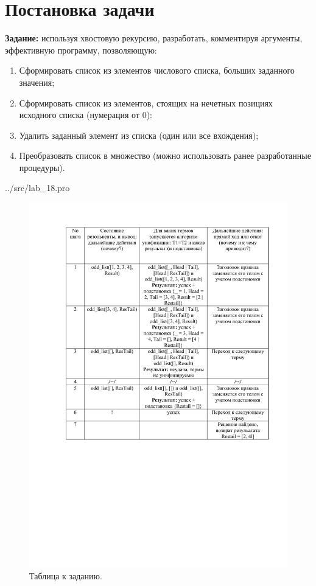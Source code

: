 \section*{Постановка задачи}

\textbf{Задание:} используя хвостовую рекурсию, разработать, комментируя аргументы, эффективную программу, позволяющую:
\begin{enumerate}
	\item Сформировать список из элементов числового списка, больших заданного значения;
	\item Сформировать список из элементов, стоящих на нечетных позициях исходного списка (нумерация от 0):
	\item Удалить заданный элемент из списка (один или все вхождения);
	\item Преобразовать список в множество (можно использовать ранее разработанные процедуры).
\end{enumerate}

\begin{lstinputlisting}[label=third,caption=Решение задания №1, language=prolog, firstline=1, lastline=47]{../src/lab_18.pro}
\end{lstinputlisting}

\begin{figure}[H]
	\caption{Таблица к заданию.}
	\begin{center}
		\includegraphics[scale=0.85]{img/18.1.pdf}
	\end{center}
	
\end{figure}
